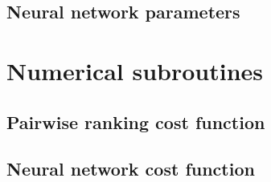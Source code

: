 \subsection{Neural network parameters}
\label{sec:nnetworkparams}

\section{Numerical subroutines}
\subsection{Pairwise ranking cost function}
\label{sec:modelcost}

\subsection{Neural network cost function}
\label{sec:nncost}
